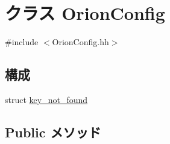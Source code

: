 \hypertarget{classOrionConfig}{
\section{クラス OrionConfig}
\label{classOrionConfig}
}


{\ttfamily \#include $<$OrionConfig.hh$>$}\subsection*{構成}
\begin{DoxyCompactItemize}
\item 
struct \hyperlink{structOrionConfig_1_1key__not__found}{key\_\-not\_\-found}
\end{DoxyCompactItemize}
\subsection*{Public メソッド}
